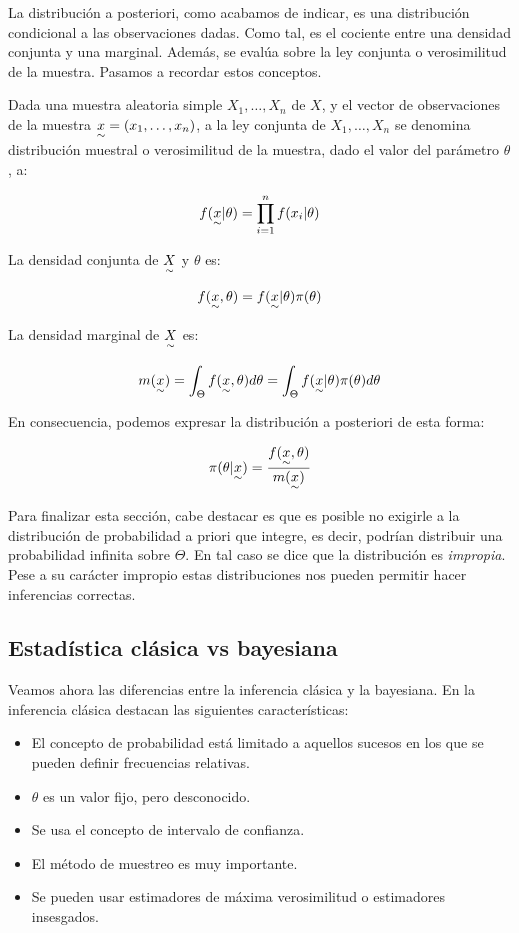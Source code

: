 \documentclass{article}
\begin{document}
La distribución a posteriori, como acabamos de indicar, es una distribución condicional a las observaciones dadas. Como tal, es el cociente entre una densidad conjunta y una marginal. Además, se evalúa sobre la ley conjunta o verosimilitud de la muestra. Pasamos a recordar estos conceptos.

\begin{definition}
	Dada una muestra aleatoria simple $X_1,\dots,X_n$ de $X$, y el vector de observaciones de la muestra $\underset{\sim}{x}=(x_1,\dots,x_n)$, a la ley conjunta de $X_1,\dots,X_n$ se denomina distribución muestral o verosimilitud de la muestra, dado el valor del parámetro $\theta$, a:

	\[f(\underset{\sim}{x}|\theta)=\prod_{i=1}^{n}{f(x_i|\theta)}\]

	La densidad conjunta de $\underset{\sim}{X}$ y $\theta$ es:

	\[f(\underset{\sim}{x},\theta)=f(\underset{\sim}{x}|\theta)\pi(\theta)\]

	La densidad marginal de $\underset{\sim}{X}$ es:

	\[m(\underset{\sim}{x}) = \int_{\Theta}{f(\underset{\sim}{x},\theta)d\theta} = \int_{\Theta}{f(\underset{\sim}{x}|\theta)\pi(\theta)d\theta}\]

	En consecuencia, podemos expresar la distribución a posteriori de esta forma:

	\[\pi(\theta|\underset{\sim}{x}) = \frac{f(\underset{\sim}{x},\theta)}{m(\underset{\sim}{x})}\]
\end{definition}

Para finalizar esta sección, cabe destacar es que es posible no exigirle a la distribución de probabilidad a priori que integre, es decir, podrían distribuir una probabilidad infinita sobre $\Theta$. En tal caso se dice que la distribución es \textit{impropia}. Pese a su carácter impropio estas distribuciones nos pueden permitir hacer inferencias correctas.


\subsection{Estadística clásica vs bayesiana}

Veamos ahora las diferencias entre la inferencia clásica y la bayesiana. En la inferencia clásica destacan las siguientes características:

\begin{itemize}
	\item El concepto de probabilidad está limitado a aquellos sucesos en los que se pueden definir frecuencias relativas.
	\item $\theta$ es un valor fijo, pero desconocido.
	\item Se usa el concepto de intervalo de confianza.%
	\item El método de muestreo es muy importante.
	\item Se pueden usar estimadores de máxima verosimilitud o estimadores insesgados.
\end{itemize}
\end{document}
